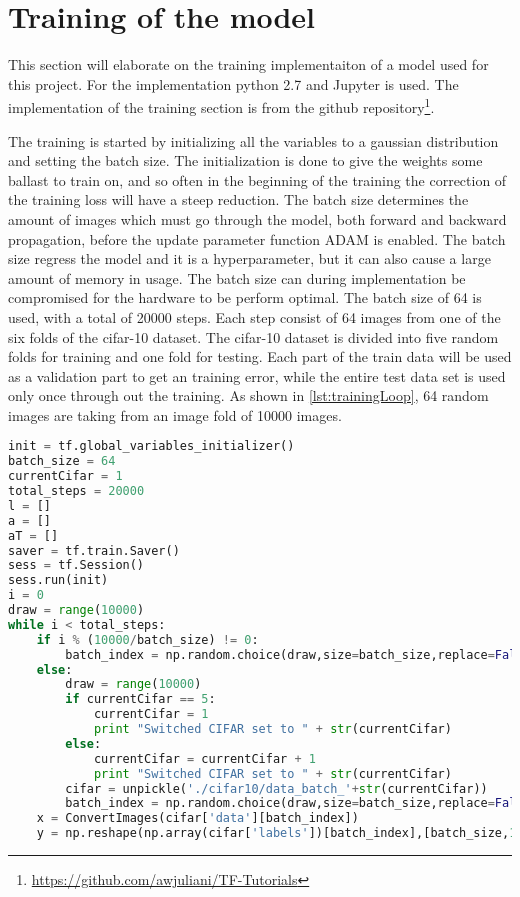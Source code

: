 \section{Training of the model}

This section will elaborate on the training implementaiton of a model used for this project. For the implementation python 2.7 and Jupyter is used. The implementation of the training section is from the github repository\footnote{\url{https://github.com/awjuliani/TF-Tutorials}}.

The training is started by initializing all the variables to a gaussian distribution and setting the batch size. The initialization is done to give the weights some ballast to train on, and so often in the beginning of the training the correction of the training loss will have a steep reduction. The batch size determines the amount of images which must go through the model, both forward and backward propagation, before the update parameter function ADAM is enabled. The batch size regress the model and it is a hyperparameter, but it can also cause a large amount of memory in usage. The batch size can during implementation be compromised for the hardware to be perform optimal. The batch size of 64 is used, with a total of 20000 steps. Each step consist of 64 images from one of the six folds of the cifar-10 dataset. The cifar-10 dataset is divided into five random folds for training and one fold for testing. Each part of the train data will be used as a validation part to get an training error, while the entire test data set is used only once through out the training. As shown in \ref{lst:trainingLoop}, 64 random images are taking from an image fold of 10000 images. 

\begin{lstlisting}[language=Python, label=lst:trainingLoop, caption=for loop which finds the 64 training images for training the model]
init = tf.global_variables_initializer()
batch_size = 64
currentCifar = 1
total_steps = 20000
l = []
a = []
aT = []
saver = tf.train.Saver()
sess = tf.Session()
sess.run(init)
i = 0
draw = range(10000)
while i < total_steps:
	if i % (10000/batch_size) != 0:
		batch_index = np.random.choice(draw,size=batch_size,replace=False)
	else:
		draw = range(10000)
		if currentCifar == 5:
			currentCifar = 1
			print "Switched CIFAR set to " + str(currentCifar)
		else:
			currentCifar = currentCifar + 1
			print "Switched CIFAR set to " + str(currentCifar)
		cifar = unpickle('./cifar10/data_batch_'+str(currentCifar))
		batch_index = np.random.choice(draw,size=batch_size,replace=False)
	x = ConvertImages(cifar['data'][batch_index])  
	y = np.reshape(np.array(cifar['labels'])[batch_index],[batch_size,1])
\end{lstlisting}

